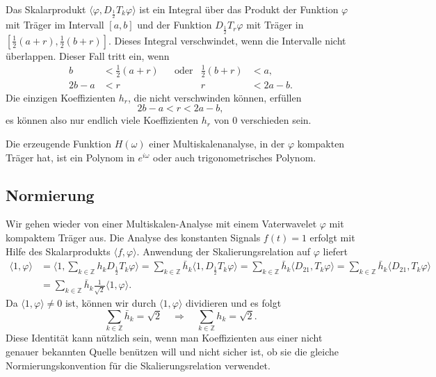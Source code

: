 Das Skalarprodukt
$\langle \varphi, D_{\frac12}T_k\varphi\rangle$
ist ein Integral über das Produkt der Funktion $\varphi$ mit Träger im Intervall
$[a,b]$ und der Funktion $D_{\frac12}T_r\varphi$  mit Träger in
$[\frac12(a+r),\frac12(b+r)]$.
Dieses Integral verschwindet, wenn die Intervalle nicht überlappen.
Dieser Fall tritt ein, wenn
\[
\begin{aligned}
b&<\frac12(a+r) &&\text{oder}& \frac12(b+r) &< a,
\\
2b-a&<r         &&           &            r &< 2a-b.
\end{aligned}
\]
Die einzigen Koeffizienten $h_r$, die nicht verschwinden können, erfüllen
\[
2b-a < r < 2a-b,
\]
es können also nur endlich viele Koeffizienten $h_r$ von $0$ verschieden
sein.

\begin{konsequenz}
Die erzeugende Funktion $H(\omega)$ einer Multiskalenanalyse, in der
$\varphi$ kompakten Träger hat, ist ein Polynom in $e^{i\omega}$ oder auch
trigonometrisches Polynom.
\end{konsequenz}

\subsection{Normierung}
%
Wir gehen wieder von einer Multiskalen-Analyse mit einem Vaterwavelet
$\varphi$ mit kompaktem Träger aus.
Die Analyse des konstanten Signals $f(t)=1$ erfolgt mit Hilfe des
Skalarprodukts $\langle f,\varphi\rangle$.
Anwendung der Skalierungsrelation auf $\varphi$ liefert
\begin{align*}
\langle 1,\varphi\rangle
&=
\biggl\langle
1,\sum_{k\in\mathbb Z} h_kD_{\frac12}T_k\varphi
\biggr\rangle
=
\sum_{k\in\mathbb Z}
\bar{h}_k
\langle
1,
D_{\frac12}T_k\varphi
\rangle
=
\sum_{k\in\mathbb Z}
\bar{h}_k
\langle
D_21,
T_k\varphi
\rangle
=
\sum_{k\in\mathbb Z}
\bar{h}_k
\langle
D_21,
T_k\varphi
\rangle
\\
&=
\sum_{k\in\mathbb Z}
\bar{h}_k
\frac{1}{\sqrt{2}}
\langle 1,\varphi\rangle.
\end{align*}
Da $\langle 1,\varphi\rangle\ne 0$ ist, können wir durch
$\langle 1,\varphi\rangle$ dividieren und es folgt
\begin{equation}
\sum_{k\in\mathbb Z} \bar{h}_k = \sqrt{2}
\quad\Rightarrow\quad
\sum_{k\in\mathbb Z} h_k = \sqrt{2}.
\label{buch:kompakt:hsumme}
\end{equation}
Diese Identität kann nützlich sein, wenn man Koeffizienten aus einer
nicht genauer bekannten Quelle benützen will und nicht sicher ist,
ob sie die gleiche Normierungskonvention für die Skalierungsrelation
verwendet.

